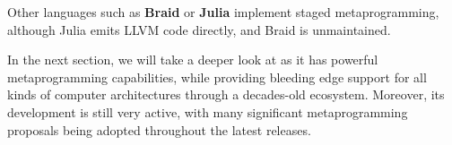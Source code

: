 \documentclass[../main]{subfiles}
\begin{document}
Other languages such as \textbf{Braid} \cite{braid} or
\textbf{Julia} \cite{julia} implement staged metaprogramming,
although Julia emits LLVM code directly, and Braid is unmaintained.

In the next section, we will take a deeper look at \cpp as it has
powerful metaprogramming capabilities, while providing bleeding edge support for
all kinds of computer architectures through a decades-old ecosystem. Moreover,
its development is still very active, with many significant metaprogramming
proposals being adopted throughout the latest
releases\cite{10.1145/3564719.3568692}.
\end{document}

